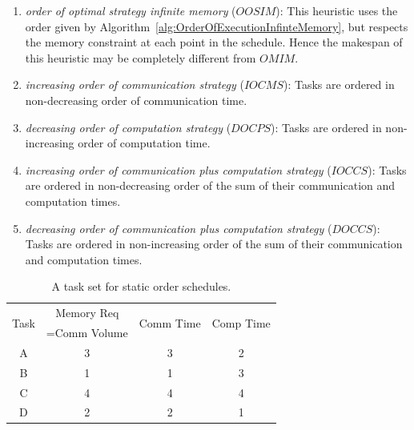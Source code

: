 \documentclass[runningheads]{llncs} %
\begin{document}
\begin{enumerate}[label=\roman*)]
	\item \textit{order  of  optimal strategy infinite memory} ($OOSIM$): This heuristic uses the order given by Algorithm~\ref{alg:OrderOfExecutionInfinteMemory}, but respects the memory constraint at each point in the schedule. Hence the makespan of this heuristic may be completely different from $OMIM$.
	
	\item \textit{increasing order of communication strategy} ($IOCMS$): Tasks are ordered  in non-decreasing order of communication time. 
	
	\item \textit{decreasing order of computation strategy} ($DOCPS$): Tasks are ordered in non-increasing order of computation time. 
	\item \textit{increasing order of communication plus computation strategy} ($IOCCS$): Tasks are ordered in non-decreasing order of the sum of their communication and computation times.
	\item \textit{decreasing order of communication plus computation strategy} ($DOCCS$): Tasks are ordered in non-increasing order of the sum of their communication and computation times.
	
\end{enumerate}
\begin{table}[htb]
	\begin{center}
		
		\begin{tabular}{|c|c|c|c|}
			\hline
			\multirow{2}{*}{Task} & Memory Req & \multirow{2}{*}{Comm Time} & \multirow{2}{*}{Comp Time}\\  
			&=Comm Volume && \\ \hline
			A & 3 & 3 &  2\\ \hline
			B & 1 & 1 & 3\\ \hline
			C & 4 & 4 & 4\\ \hline
			D & 2 & 2 & 1\\ \hline
		\end{tabular}
		\caption{\label{tab:staticOrderExample} A task set for static order schedules.}
	\end{center}
\end{table}
\end{document}
